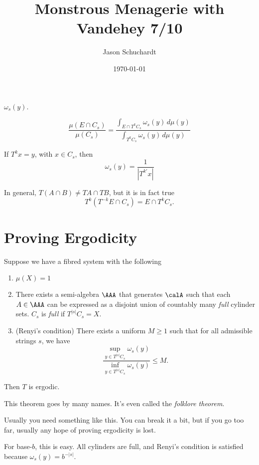 \documentclass{article}
\title{Monstrous Menagerie with Vandehey 7/10}
\author{Jason Schuchardt}
\date{\today}
\begin{document}
\maketitle

$\omega_s(y)$.

\[\frac{\mu(E\cap C_s)}{\mu(C_s)} 
= \frac{\int_{E\cap T^kC_s} \omega_s(y)\,d\mu(y)}{
    \int_{T^kC_s} \omega_s(y)\,d\mu(y)
}
\]

If $T^kx = y$, with $x\in C_s$, then 
\[\omega_s(y) = \frac{1}{|T^{k\prime}x|}\]

\begin{remark}
    In general, $T(A\cap B) \ne TA \cap TB$, but it is in 
    fact true 
    \[T^k(T^{-k}E\cap C_s) = E\cap T^kC_s. \]
\end{remark}
\section{Proving Ergodicity}

\begin{theorem}
    Suppose we have a fibred system with the following
    \begin{enumerate}
        \item $\mu(X)=1$
        \item There exists a semi-algebra $\AAA$ that 
            generates $\calA$ such that each $A\in \AAA$
            can be expressed as a disjoint union of 
            countably many \emph{full} cylinder sets.
            $C_s$ is \emph{full} if $T^{|s|}C_s = X$.
        \item (Renyi's condition) There exists a uniform
            $M\ge 1$ such that for all admissible strings
            $s$, we have 
            \[
                \frac{\sup_{y\in T^{|s|}C_s} \omega_s(y)}{
                    \inf_{y\in T^{|s|}C_s} \omega_s(y)
                } \le M.
            \]
    \end{enumerate}

    Then $T$ is ergodic.
\end{theorem}

This theorem goes by many names. It's even called the 
\emph{folklore theorem}.

Usually you need something like this. You can break it a
bit, but if you go too far, usually any hope of proving
ergodicity is lost.

\begin{example}[Base-$b$]
    For base-$b$, this is easy. All cylinders are full,
    and Renyi's condition is satisfied because 
    $\omega_s(y) = b^{-|s|}$.
\end{example}
\end{document}
